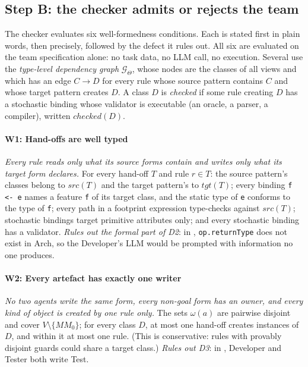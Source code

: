 \documentclass[10pt,a4paper]{article}
\newcommand{\Team}{\Theta}
\newcommand{\W}[1]{\textsf{W#1}}
\newcommand{\D}[1]{\textsf{D#1}}
\newcommand{\MM}{\mathit{MM}}
\newcommand{\cls}[1]{\textsf{#1}}
\newcommand{\code}[1]{\texttt{#1}}
\begin{document}
\subsection{Step B: the checker admits or rejects the team}\label{sec:check}

The checker evaluates six well-formedness conditions. Each is stated
first in plain words, then precisely, followed by the defect it rules out.
All six are evaluated on the team specification alone: no task data, no
LLM call, no execution. Several use the \emph{type-level dependency graph}
$\mathcal{G}_\Team$, whose nodes are the classes of all views and which has
an edge $C\to D$ for every rule whose source pattern contains $C$ and whose
target pattern creates $D$. A class $D$ is \emph{checked} if some rule
creating $D$ has a stochastic binding whose validator is executable (an
oracle, a parser, a compiler), written $\mathit{checked}(D)$.

\paragraph{\W{1}: Hand-offs are well typed} \emph{Every rule reads only
what its source forms contain and writes only what its target form
declares.} For every hand-off $T$ and rule $r\in T$: the source pattern's
classes belong to $\mathit{src}(T)$ and the target pattern's to
$\mathit{tgt}(T)$; every binding \code{f <- e} names a feature \code{f} of
its target class, and the static type of \code{e} conforms to the type of
\code{f}; every path in a footprint expression type-checks against
$\mathit{src}(T)$; stochastic bindings target primitive attributes only;
and every stochastic binding has a validator. \emph{Rules out the formal
part of \D{2}}: in , \code{op.returnType} does not exist
in \cls{Arch}, so the Developer's LLM would be prompted with information no
one produces.

\paragraph{\W{2}: Every artefact has exactly one writer} \emph{No two
agents write the same form, every non-goal form has an owner, and every
kind of object is created by one rule only.} The sets $\omega(a)$ are
pairwise disjoint and cover $V\setminus\{\MM_0\}$; for every class $D$, at
most one hand-off creates instances of $D$, and within it at most one rule.
(This is conservative: rules with provably disjoint guards could share a
target class.) \emph{Rules out \D{3}}: in , Developer
and Tester both write \cls{Test}.
\end{document}
